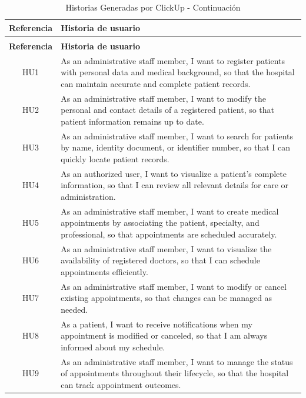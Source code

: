 \begin{longtable}{|c|p{12cm}|}
\caption{Historias Generadas por ClickUp} \label{tab:historias_clickup} \\
\hline
\textbf{Referencia} & \textbf{Historia de usuario} \\
\hline
\endfirsthead


\caption{Historias Generadas por ClickUp - Continuación} \\
\hline
\textbf{Referencia} & \textbf{Historia de usuario} \\
\hline
\endhead

\hline
\endfoot

\hline
\endlastfoot

HU1 & As an administrative staff member, I want to register patients with personal data and medical background, so that the hospital can maintain accurate and complete patient records. \\
\hline
HU2 & As an administrative staff member, I want to modify the personal and contact details of a registered patient, so that patient information remains up to date. \\
\hline
HU3 & As an administrative staff member, I want to search for patients by name, identity document, or identifier number, so that I can quickly locate patient records. \\
\hline
HU4 & As an authorized user, I want to visualize a patient's complete information, so that I can review all relevant details for care or administration. \\
\hline
HU5 & As an administrative staff member, I want to create medical appointments by associating the patient, specialty, and professional, so that appointments are scheduled accurately. \\
\hline
HU6 & As an administrative staff member, I want to visualize the availability of registered doctors, so that I can schedule appointments efficiently. \\
\hline
HU7 & As an administrative staff member, I want to modify or cancel existing appointments, so that changes can be managed as needed. \\
\hline
HU8 & As a patient, I want to receive notifications when my appointment is modified or canceled, so that I am always informed about my schedule. \\
\hline
HU9 & As an administrative staff member, I want to manage the status of appointments throughout their lifecycle, so that the hospital can track appointment outcomes. \\

\end{longtable}
